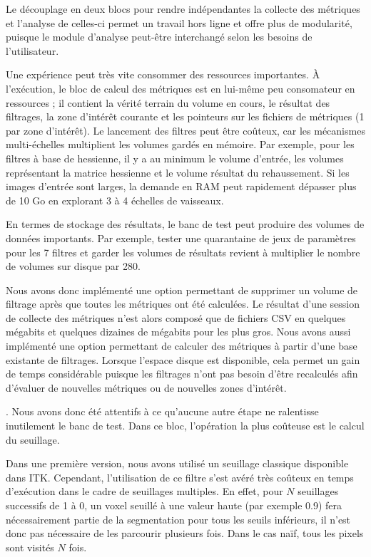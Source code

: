 Le découplage en deux blocs pour rendre indépendantes la collecte des métriques et l'analyse de celles-ci permet un travail hors ligne et offre plus de modularité, puisque le module d'analyse peut-être interchangé selon les besoins de l'utilisateur. 

Une expérience peut très vite consommer des ressources importantes. À l'exécution, le bloc de calcul des métriques est en lui-même peu consomateur en ressources ; il contient la vérité terrain du volume en cours, le résultat des filtrages, la zone d'intérêt courante et les pointeurs sur les fichiers de métriques (1 par zone d'intérêt). Le lancement des filtres peut être coûteux, car les mécanismes multi-échelles multiplient les volumes gardés en mémoire. Par exemple, pour les filtres à base de hessienne, il y a au minimum le volume d'entrée, les volumes représentant la matrice hessienne et le volume résultat du rehaussement. Si les images d'entrée sont larges, la demande en RAM peut rapidement dépasser plus de 10 Go en explorant 3 à 4 échelles de vaisseaux. 

En termes de stockage des résultats, le banc de test peut produire des volumes de données importants. Par exemple, tester une quarantaine de jeux de paramètres pour les 7 filtres et garder les volumes de résultats revient à multiplier le nombre de volumes sur disque par 280. 

Nous avons donc implémenté une option permettant de supprimer un volume de filtrage après que toutes les métriques ont été calculées. Le résultat d'une session de collecte des métriques n'est alors composé que de fichiers CSV en quelques mégabits et quelques dizaines de mégabits pour les plus gros. Nous avons aussi implémenté une option permettant de calculer des métriques à partir d'une base existante de filtrages. Lorsque l'espace disque est disponible, cela permet un gain de temps considérable puisque les filtrages n'ont pas besoin d'être recalculés afin d'évaluer de nouvelles métriques ou de nouvelles zones d'intérêt.

. Nous avons donc été attentifs à ce qu'aucune autre étape ne ralentisse inutilement le banc de test. Dans ce bloc, l'opération la plus coûteuse est le calcul du seuillage.

Dans une première version, nous avons utilisé un seuillage classique disponible dans ITK. Cependant, l'utilisation de ce filtre s'est avéré très coûteux en temps d'exécution dans le cadre de seuillages multiples. En effet, pour $N$ seuillages successifs de 1 à 0, un voxel seuillé à une valeur haute (par exemple 0.9) fera nécessairement partie de la segmentation pour tous les seuils inférieurs, il n'est donc pas nécessaire de les parcourir plusieurs fois. Dans le cas naïf, tous les pixels sont visités $N$ fois.

